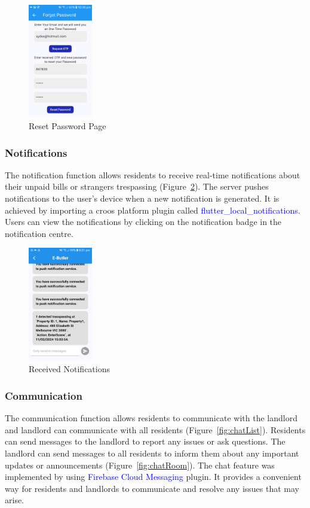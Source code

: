 \documentclass[sigconf,nonacm]{acmart}\settopmatter{printfolios=true}
\newcommand{\specialterm}[1]{\textcolor{blue}{#1}}
\begin{document}
\begin{figure}[htbp]
  \centering
  \includegraphics[width=0.25\textwidth]{resetPassword.jpg}
  \caption{Reset Password Page}
  \label{fig:resetPassword}
\end{figure}

\subsubsection{\textbf{Notifications}}
The notification function allows residents to receive real-time notifications about their unpaid bills or strangers trespassing (Figure~\ref{fig:warnings}). The server pushes notifications to the user's device when a new notification is generated. It is achieved by importing a croos platform plugin called \specialterm{flutter\_local\_notifications}. Users can view the notifications by clicking on the notification badge in the notification centre.

\begin{figure}[htbp]
  \centering
  \includegraphics[width=0.25\textwidth]{onlyRecceiveWarnings.jpg}
  \caption{Received Notifications}
  \label{fig:warnings}
\end{figure}

\subsubsection{\textbf{Communication}}
The communication function allows residents to communicate with the landlord and landlord can communicate with all residents (Figure~\ref{fig:chatList}). Residents can send messages to the landlord to report any issues or ask questions. The landlord can send messages to all residents to inform them about any important updates or announcements (Figure~\ref{fig:chatRoom}). The chat feature was implemented by using \specialterm{Firebase Cloud Messaging} plugin. It provides a convenient way for residents and landlords to communicate and resolve any issues that may arise.
\end{document}
